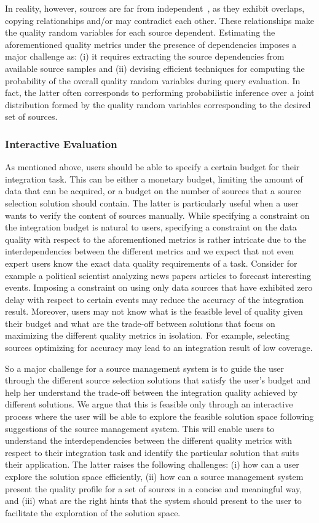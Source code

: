 \documentclass{sig-alternate}
\begin{document}
In reality, however, sources are far from independent~\cite{berti-equille:sailing, dong:2009}, as they exhibit overlaps, copying relationships and/or may contradict each other. These relationships make the quality random variables for each source dependent. Estimating the aforementioned quality metrics under the presence of dependencies imposes a major challenge as: (i) it  requires extracting the source dependencies from available source samples and (ii) devising efficient techniques for computing the probability of the overall quality random variables during query evaluation. In fact, the latter often corresponds to performing probabilistic inference over a joint distribution formed by the quality random variables corresponding to the desired set of sources.

\subsubsection{Interactive Evaluation}
\label{sec:eval}
As mentioned above, users should be able to specify a certain budget for their integration task. This can be either a monetary budget, limiting the amount of data that can be acquired, or a budget on the number of sources that a source selection solution should contain. The latter is particularly useful when a user wants to verify the content of sources manually. While specifying a constraint on the integration budget is natural to users, specifying a constraint on the data quality with respect to the aforementioned metrics is rather intricate due to the interdependencies between the different metrics and we expect that not even expert users know the exact data quality requirements of a task. Consider for example a political scientist analyzing news papers articles to forecast interesting events. Imposing a constraint on using only data sources that have exhibited zero delay with respect to certain events may reduce the accuracy of the integration result. Moreover, users may not know what is the feasible level of quality given their budget and what are the trade-off between solutions that focus on maximizing the different quality metrics in isolation. For example, selecting sources optimizing for accuracy may lead to an integration result of low coverage.  

So a major challenge for a source management system is to guide the user through the different source selection solutions that satisfy the user's budget and help her understand the trade-off between the integration quality achieved by different solutions. We argue that this is feasible only through an interactive process where the user will be able to explore the feasible solution space following suggestions of the source management system. This will enable users to understand the interdependencies between the different quality metrics with respect to their integration task and identify the particular solution that suits their application. The latter raises the following challenges: (i) how can a user explore the solution space efficiently, (ii) how can a source management system present the quality profile for a set of sources in a concise and meaningful way, and (iii) what are the right hints that the system should present to the user to facilitate the exploration of the solution space. 
\end{document}

